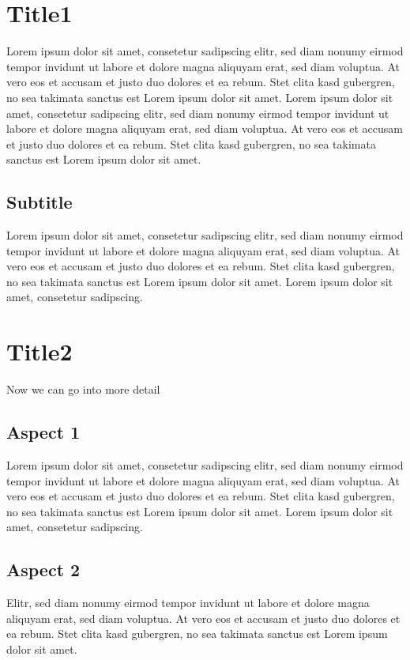 
\section{Title1}
Lorem ipsum dolor sit amet, consetetur sadipscing elitr, sed diam nonumy eirmod tempor invidunt ut labore et dolore
magna aliquyam erat, sed diam voluptua. At vero eos et accusam et justo duo dolores et ea rebum. Stet clita kasd
gubergren, no sea takimata sanctus est Lorem ipsum dolor sit amet. Lorem ipsum dolor sit amet,
consetetur sadipscing
elitr, sed diam nonumy eirmod tempor invidunt ut labore et dolore magna aliquyam erat, sed diam voluptua. At vero
eos et accusam et justo duo dolores et ea rebum. Stet clita kasd gubergren, no sea takimata sanctus est Lorem ipsum
dolor sit amet.   

\subsection{Subtitle}
Lorem ipsum dolor sit amet, consetetur sadipscing elitr, sed diam nonumy eirmod tempor invidunt ut labore et dolore
magna aliquyam erat, sed diam voluptua. At vero eos et accusam et justo duo dolores et ea rebum. Stet clita kasd
gubergren, no sea takimata sanctus est Lorem ipsum dolor sit amet. Lorem ipsum dolor sit amet,
consetetur sadipscing.

\section{Title2}
Now we can go into more detail

\subsection{Aspect 1}
Lorem ipsum dolor sit amet, consetetur sadipscing elitr, sed diam nonumy eirmod tempor invidunt ut labore et dolore
magna aliquyam erat, sed diam voluptua. At vero eos et accusam et justo duo dolores et ea rebum. Stet clita kasd
gubergren, no sea takimata sanctus est Lorem ipsum dolor sit amet. Lorem ipsum dolor sit amet,
consetetur sadipscing.

\subsection{Aspect 2}
Elitr, sed diam nonumy eirmod tempor invidunt ut labore et dolore magna aliquyam erat, sed diam voluptua. At vero
eos et accusam et justo duo dolores et ea rebum. Stet clita kasd gubergren, no sea takimata sanctus est Lorem ipsum
dolor sit amet.


